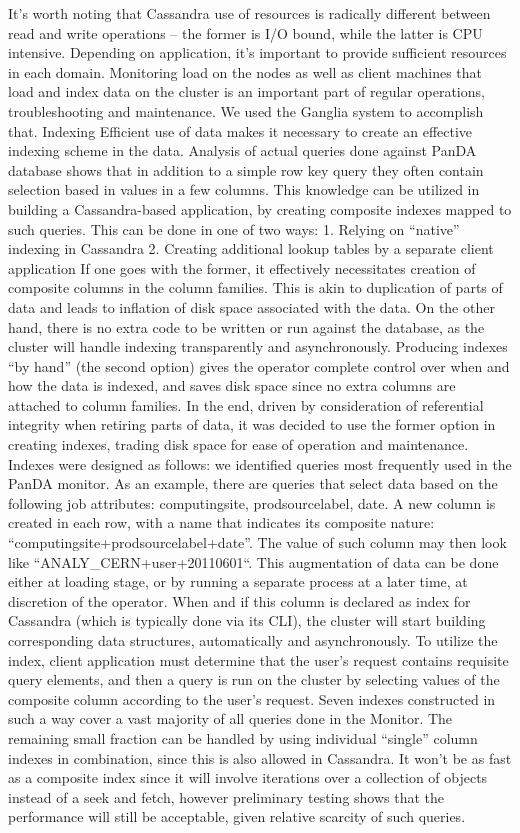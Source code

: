 It’s worth noting that Cassandra use of resources is radically different between read and write operations – the former is I/O bound, while the latter is CPU intensive. Depending on application, it’s important to provide sufficient resources in each domain.
Monitoring load on the nodes as well as client machines that load and index data on the cluster is an important part of regular operations, troubleshooting and maintenance. We used the Ganglia system to accomplish that.
Indexing
Efficient use of data makes it necessary to create an effective indexing scheme in the data. Analysis of actual queries done against PanDA database shows that in addition to a simple row key query they often contain selection based in values in a few columns. This knowledge can be utilized in building a Cassandra-based application, by creating composite indexes mapped to such queries. This can be done in one of two ways:
1. Relying on “native” indexing in Cassandra
2. Creating additional lookup tables by a separate client application
If one goes with the former, it effectively necessitates creation of composite columns in the column families. This is akin to duplication of parts of data and leads to inflation of disk space associated with the data. On the other hand, there is no extra code to be written or run against the database, as the cluster will handle indexing transparently and asynchronously.
Producing indexes “by hand” (the second option) gives the operator complete control over when and how the data is indexed, and saves disk space since no extra columns are attached to column families. In the end, driven by consideration of referential integrity when retiring parts of data, it was decided to use the former option in creating indexes, trading disk space for ease of operation and maintenance.
Indexes were designed as follows: we identified queries most frequently used in the PanDA monitor. As an example, there are queries that select data based on the following job attributes: computingsite, prodsourcelabel, date. A new column is created in each row, with a name that indicates its composite nature: “computingsite+prodsourcelabel+date”. The value of such column may then look like ``ANALY\_CERN+user+20110601``. This augmentation of data can be done either at loading stage, or by running a separate process at a later time, at discretion of the operator. When and if this column is declared as index for Cassandra (which is typically done via its CLI), the cluster will start building corresponding data structures, automatically and asynchronously. To utilize the index, client application must determine that the user’s request contains requisite query elements, and then a query is run on the cluster by selecting values of the composite column according to the user’s request. Seven indexes constructed in such a way cover a vast majority of all queries done in the Monitor. The remaining small fraction can be handled by using individual “single” column indexes in combination, since this is also allowed in Cassandra. It won’t be as fast as a composite index since it will involve iterations over a collection of objects instead of a seek and fetch, however preliminary testing shows that the performance will still be acceptable, given relative scarcity of such queries.
